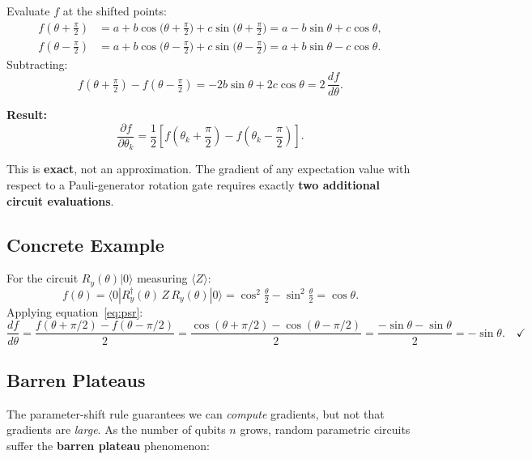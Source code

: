 \documentclass[a4paper,11pt]{article}
\renewcommand{\ket}[1]{|#1\rangle}
\renewcommand{\bra}[1]{\langle#1|}
\begin{document}
\begin{mathbox}
Evaluate $f$ at the shifted points:
\begin{align}
    f\!\left(\theta + \tfrac\pi2\right) &= a
        + b\cos\!\bigl(\theta+\tfrac\pi2\bigr)
        + c\sin\!\bigl(\theta+\tfrac\pi2\bigr)
        = a - b\sin\theta + c\cos\theta, \\
    f\!\left(\theta - \tfrac\pi2\right) &= a
        + b\cos\!\bigl(\theta-\tfrac\pi2\bigr)
        + c\sin\!\bigl(\theta-\tfrac\pi2\bigr)
        = a + b\sin\theta - c\cos\theta.
\end{align}
Subtracting:
\begin{equation}
    f\!\left(\theta+\tfrac\pi2\right) - f\!\left(\theta-\tfrac\pi2\right)
    = -2b\sin\theta + 2c\cos\theta = 2\,\frac{df}{d\theta}.
\end{equation}

\textbf{Result:}
\begin{equation}
    \boxed{\frac{\partial f}{\partial\theta_k}
    = \frac{1}{2}\left[f\!\left(\theta_k + \frac\pi2\right)
    - f\!\left(\theta_k - \frac\pi2\right)\right].}
    \label{eq:psr}
\end{equation}

This is \textbf{exact}, not an approximation. The gradient of any
expectation value with respect to a Pauli-generator rotation gate
requires exactly \textbf{two additional circuit evaluations}.
\end{mathbox}

\subsection{Concrete Example}

For the circuit $R_y(\theta)\ket{0}$ measuring $\langle Z\rangle$:
\[
    f(\theta) = \bra{0}R_y^\dagger(\theta)\,Z\,R_y(\theta)\ket{0}
    = \cos^2\!\tfrac\theta2 - \sin^2\!\tfrac\theta2 = \cos\theta.
\]
Applying equation~\eqref{eq:psr}:
\[
    \frac{df}{d\theta}
    = \frac{f(\theta+\pi/2) - f(\theta-\pi/2)}{2}
    = \frac{\cos(\theta+\pi/2) - \cos(\theta-\pi/2)}{2}
    = \frac{-\sin\theta - \sin\theta}{2} = -\sin\theta. \quad\checkmark
\]

\subsection{Barren Plateaus}

The parameter-shift rule guarantees we can \emph{compute} gradients, but not
that gradients are \emph{large}. As the number of qubits $n$ grows, random
parametric circuits suffer the \textbf{barren plateau} phenomenon:
\end{document}
